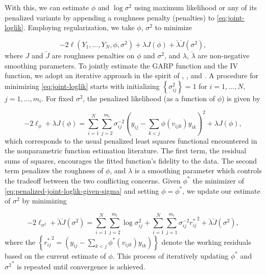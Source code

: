\documentclass[12pt]{article}
\theoremstyle{definition}
\begin{document}
\bigskip

With this, we can estimate $\phi$ and $\log\sigma^2$ using maximum likelihood or any of its penalized variants by appending a roughness penalty (penalties) to \ref{eq:joint-loglik}. Employing regularization, we take $\phi$, $\sigma^2$ to minimize 

\begin{equation} \label{eq:penalized-joint-loglik}
-2\ell\left( Y_1,\dots, Y_N, \phi, \sigma^2 \right) +    \lambda J\left( \phi \right) +  \breve{\lambda}\breve{J}\left( \sigma^2 \right),
\end{equation}
\noindent
where $J$ and $\breve{J}$ are roughness penalties on $\phi$ and $\sigma^2$, and $\lambda$, $\breve{\lambda}$ are non-negative smoothing parameters.  To jointly estimate the GARP function and the IV function, we adopt an iterative approach in the spirit of \citet{huang2006covariance}, \citet{huang2007estimation}, and \citet{pourahmadi2000maximum}. A procedure for minimizing \ref{eq:joint-loglik} starts with initializing $\left\{\sigma^2_{ij}\right\} = 1$ for $i = 1,\dots, N$, $j = 1,\dots, m_i$.  For fixed $\sigma^2$, the penalized likelihood (as a function of $\phi$) is given by

\begin{equation} \label{eq:penalized-joint-loglik-given-sigma}
-2\ell_\phi + \lambda J\left(\phi\right) = \sum_{i=1}^N \sum_{j=2}^{m_i} \sigma^{-2}_{ij}\left( y_{ij} - \sum_{k<j} \phi\left(v_{ijk}\right) y_{ik}  \right)^2 + \lambda J\left( \phi \right),
\end{equation}
\noindent
which corresponds to the usual penalized least squares functional encountered  in the nonparametric function estimation literature. The first term, the residual sums of squares, encourages the fitted function's fidelity to the data. The second term penalizes the roughness of $\phi$, and $\lambda$ is a smoothing parameter which controls the tradeoff between the two conflicting concerns. Given $\phi^*$ the minimizer of \ref{eq:penalized-joint-loglik-given-sigma} and setting $\phi = \phi^*$, we update our estimate of $\sigma^2$ by minimizing 

\begin{equation} \label{eq:penalized-joint-loglik-given-phi}
-2\ell_{\sigma^2} + \breve{\lambda} \breve{J}\left(\sigma^2\right) = \sum_{i=1}^N \sum_{j=2}^{m_i} \log \sigma^2_{ij} + \sum_{i=1}^N \sum_{j=1}^{m_i} \sigma_{ij}^{-2} {r_{ij}^*}^2 + \breve{\lambda} \breve{J}\left(\sigma^2 \right),
\end{equation}
where the $\left\{{r_{ij}^*}^2  =\left( y_{ij} - \sum_{k<j} \phi^*\left(v_{ijk}\right) y_{ik}  \right)\right\}$ denote the working residuals based on the current estimate of $\phi$. This process of iteratively updating $\phi^*$ and ${\sigma^2}^*$ is repeated until convergence is achieved. 
\bigskip
\end{document}
